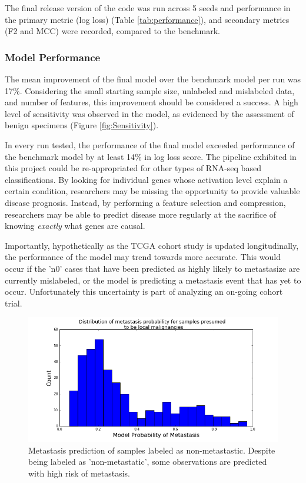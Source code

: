 \documentclass[final]{article}
\begin{document}
The final release version of the code was run across 5 seeds and performance in
the primary metric (log loss) (Table \ref{tab:performance}), and secondary
metrics (F2 and MCC) were recorded, compared to the benchmark.

\subsubsection{Model Performance}

The mean improvement of the final model over the benchmark model per run  was
17\%. Considering the small starting sample size, unlabeled and mislabeled
data, and number of features,  this improvement should be considered a success.
A high level of sensitivity was observed in the model, as evidenced by the assessment
of benign specimens (Figure \ref{fig:Sensitivity}).


In every run tested, the performance of the final model exceeded performance of
the benchmark model by at least 14\% in log loss score.  The pipeline exhibited
in this project could be re-appropriated for other types of RNA-seq based
classifications.  By looking for individual genes whose activation level explain
a certain condition, researchers may be missing the opportunity to provide
valuable disease prognosis.  Instead, by performing a feature selection and
compression, researchers may be able to predict disease more regularly at the
sacrifice of knowing \textit{exactly} what genes are causal.

Importantly, hypothetically as the TCGA cohort study is updated longitudinally,
the performance of the model may trend towards more accurate.  This would  occur
if the 'n0' cases that have been predicted as highly likely to metastasize are
currently mislabeled, or the model is predicting a metastasis event that has yet
to  occur.  Unfortunately this uncertainty is part of analyzing an on-going
cohort trial.

\begin{figure}
  \centering
  \includegraphics[scale=0.5]{N0Analysis}
  \caption{\label{fig:n0} Metastasis prediction of samples labeled as non-metastastic.
  Despite being labeled as 'non-metastatic', some observations are predicted with high risk of
  metastasis.}
\end{figure}
\end{document}
